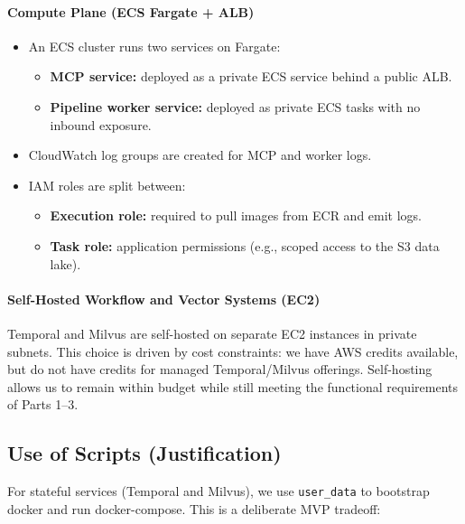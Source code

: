 \documentclass[a4paper,12pt]{article}
\begin{document}
\paragraph{Compute Plane (ECS Fargate + ALB)}
\begin{itemize}[leftmargin=*]
    \item An ECS cluster runs two services on Fargate:
    \begin{itemize}[leftmargin=*]
        \item \textbf{MCP service:} deployed as a private ECS service behind a public ALB.
        \item \textbf{Pipeline worker service:} deployed as private ECS tasks with no inbound exposure.
    \end{itemize}
    \item CloudWatch log groups are created for MCP and worker logs.
    \item IAM roles are split between:
    \begin{itemize}[leftmargin=*]
        \item \textbf{Execution role:} required to pull images from ECR and emit logs.
        \item \textbf{Task role:} application permissions (e.g., scoped access to the S3 data lake).
    \end{itemize}
\end{itemize}

\paragraph{Self-Hosted Workflow and Vector Systems (EC2)}
Temporal and Milvus are self-hosted on separate EC2 instances in private subnets. This choice is driven by cost constraints: we have AWS credits available, but do not have credits for managed Temporal/Milvus offerings. Self-hosting allows us to remain within budget while still meeting the functional requirements of Parts 1--3.

\subsection{Use of Scripts (Justification)}
For stateful services (Temporal and Milvus), we use \texttt{user\_data} to bootstrap docker and run docker-compose. This is a deliberate MVP tradeoff:
\end{document}
